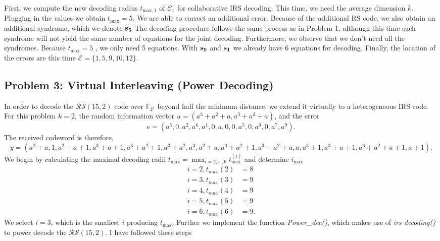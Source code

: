 \documentclass{article}
\begin{document}
First, we compute the new decoding radius $t_{\text{max},1}$ of $\mathcal{C}_1$ for collaborative IRS decoding. This time, we need the average dimension $\overline{k}$. Plugging in the values we obtain $t_{\text{max}} = 5$. We are able to correct an additional error. Because of the additional RS code, we also obtain an additional syndrome, which we denote $\vb{s_5}$
The decoding procedure follows the same process as in Problem 1, although this time each syndrome will not yield the same number of equations for the joint decoding. Furthermore, we observe that we don't need all the syndromes. Because  $t_{\text{max}} = 5$ , we only need 5 equations. With  $\vb{s_5}$  and  $\vb{s_1}$  we already have 6 equations for decoding. Finally, the location of the errors are this time $\mathcal{E} = \{1, 5, 9, 10, 12\}$.

\subsection*{Problem 3: Virtual Interleaving (Power Decoding)}
In order to decode the $\mathcal{RS}(15, 2)$ code over $\mathbb{F}_{2^4}$ beyond half the minimum distance, we extend it virtually to a heterogeneous IRS code. For this problem $k=2$, the random information vector $u=(a^3 + a^2 + a, a^3 + a^2 + a)$, and the error
\begin{equation*}
e=(a^5, 0, a^2, a^6, a^1, 0, a, 0, 0, a^5, 0, a^6, 0, a^7, a^9).
\end{equation*}
The received codeword is therefore,
\begin{equation*}
y=(a^2 + a, 1, a^2 + a + 1, a^3 + a + 1, a^3 + a^2 + 1, a^3 + a^2, a^3, a^2 + a, a^3 + a^2 + 1, a^3 + a^2 + a, a, a^3 + 1, a^3 + a + 1, a^3 + a^2 + a + 1, a + 1).
\end{equation*} 
We begin by calculating the maximal decoding radii $t_{\text{max}} =\max_{i=2,\cdots,6}t_{\text{max}}^{(i)}$ and determine $i_{\text{max}}$
\begin{align*}
i=2, t_{max}(2) &= 8\\
i=3, t_{max}(3) &= 9\\
i=4, t_{max}(4) &= 9\\
i=5, t_{max}(5) &= 9\\
i=6, t_{max}(6) &= 9.
\end{align*}
We select $i=3$, which is the smallest $i$ producing $t_{\text{max}}$. Further we implement the function \textit{Power\_dec()}, which makes use of \textit{irs decoding()} to power decode the $\mathcal{RS}(15, 2)$. I have followed these steps
\end{document}
